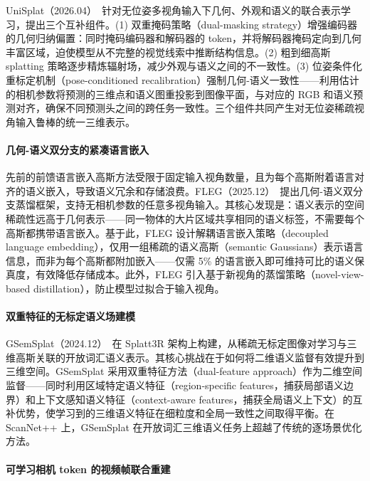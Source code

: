 UniSplat（2026.04）~\cite{2604_10573}针对无位姿多视角输入下几何、外观和语义的联合表示学习，提出三个互补组件。(1) 双重掩码策略（dual-masking strategy）增强编码器的几何归纳偏置：同时掩码编码器和解码器的 token，并将解码器掩码定向到几何丰富区域，迫使模型从不完整的视觉线索中推断结构信息。(2) 粗到细高斯 splatting 策略逐步精炼辐射场，减少外观与语义之间的不一致性。(3) 位姿条件化重标定机制（pose-conditioned recalibration）强制几何-语义一致性——利用估计的相机参数将预测的三维点和语义图重投影到图像平面，与对应的 RGB 和语义预测对齐，确保不同预测头之间的跨任务一致性。三个组件共同产生对无位姿稀疏视角输入鲁棒的统一三维表示。

\paragraph{几何-语义双分支的紧凑语言嵌入}

先前的前馈语言嵌入高斯方法受限于固定输入视角数量，且为每个高斯附着语言对齐的语义嵌入，导致语义冗余和存储浪费。FLEG（2025.12）~\cite{2512_17541}提出几何-语义双分支蒸馏框架，支持无相机参数的任意多视角输入。其核心发现是：语义表示的空间稀疏性远高于几何表示——同一物体的大片区域共享相同的语义标签，不需要每个高斯都携带语言嵌入。基于此，FLEG 设计解耦语言嵌入策略（decoupled language embedding），仅用一组稀疏的语义高斯（semantic Gaussians）表示语言信息，而非为每个高斯都附加嵌入——仅需 5\% 的语言嵌入即可维持可比的语义保真度，有效降低存储成本。此外，FLEG 引入基于新视角的蒸馏策略（novel-view-based distillation），防止模型过拟合于输入视角。

\paragraph{双重特征的无标定语义场建模}

GSemSplat（2024.12）~\cite{2412_16932}在 Splatt3R 架构上构建，从稀疏无标定图像对学习与三维高斯关联的开放词汇语义表示。其核心挑战在于如何将二维语义监督有效提升到三维空间。GSemSplat 采用双重特征方法（dual-feature approach）作为二维空间监督——同时利用区域特定语义特征（region-specific features，捕获局部语义边界）和上下文感知语义特征（context-aware features，捕获全局语义上下文）的互补优势，使学习到的三维语义特征在细粒度和全局一致性之间取得平衡。在 ScanNet++ 上，GSemSplat 在开放词汇三维语义任务上超越了传统的逐场景优化方法。

\paragraph{可学习相机 token 的视频帧联合重建}

